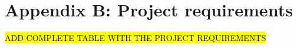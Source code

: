 \renewcommand\thechapter{B}
\chapter{Appendix B: Project requirements}
\label{AppendixB}

\hl{ADD COMPLETE TABLE WITH THE PROJECT REQUIREMENTS}
